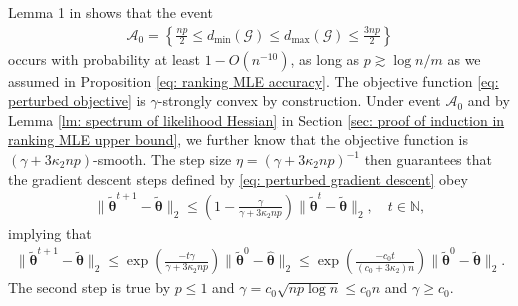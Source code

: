 \documentclass[letterpaper,12pt]{article}
\numberwithin{equation}{section}
\theoremstyle{plain}
\numberwithin{Theorem}{section}
\numberwithin{corollary}{section}
\numberwithin{proposition}{section}
\numberwithin{Lemma}{section}
{
	\theoremstyle{definition}
	\newtheorem{Definition}{Definition}
	\newtheorem{example}{Example}
	\numberwithin{example}{section}
	\newtheorem{fact}{Fact}
	\numberwithin{fact}{section}
	\newtheorem{remark}{Remark}
}
\newcommand{\1}{\mathbbm{1}}
\def\bth{{\boldsymbol{\theta}}}
\begin{document}
Lemma 1 in \cite{chen2019spectral} shows that the event 
\begin{align*}
	\mathcal A_0 = \left\{\frac{np}{2} \leq d_{\min}(\mathcal G) \leq  d_{\max}(\mathcal G) \leq \frac{3np}{2}\right\}
\end{align*}
occurs with probability at least $1-O(n^{-10})$, as long as $p \gtrsim \log n/m$ as we assumed in Proposition \ref{eq: ranking MLE accuracy}. The objective function \eqref{eq: perturbed objective} is $\gamma$-strongly convex by construction. Under event $\mathcal A_0$ and by Lemma \ref{lm: spectrum of likelihood Hessian} in Section \ref{sec: proof of induction in ranking MLE upper bound}, we further know that the objective function is $(\gamma + 3\kappa_2 np)$-smooth. The step size $\eta = (\gamma + 3\kappa_2 np)^{-1}$ then guarantees that the gradient descent steps defined by \eqref{eq: perturbed gradient descent} obey
\begin{align*}
	\|\widetilde\bth^{t+1} - \widetilde\bth\|_2 \leq \left(1 - \frac{\gamma}{\gamma + 3\kappa_2 np}\right)\|\widetilde\bth^{t} - \widetilde\bth\|_2, \quad t \in \mathbb N,
\end{align*}
implying that 
\begin{align}
	\|\widetilde\bth^{t+1} - \widetilde\bth\|_2 \leq \exp\left(\frac{-t\gamma}{\gamma + 3\kappa_2 np}\right)\|\widetilde\bth^{0} - \hat\bth\|_2 \leq \exp\left(\frac{-c_0t}{(c_0+3\kappa_2)n}\right)\|\widetilde\bth^{0} - \widetilde\bth\|_2.\label{eq: optimization error bound 1}
\end{align}
The second step is true by $p \leq 1$ and $\gamma = c_0\sqrt{np\log n} \leq c_0 n$ and $\gamma \geq c_0$. 
\end{document}
